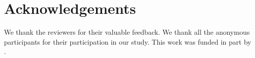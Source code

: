 \section{Acknowledgements}
% 
We thank the reviewers for their valuable feedback. 
We thank all the anonymous participants for their participation in our study. 
This work was funded in part by \xx. 

